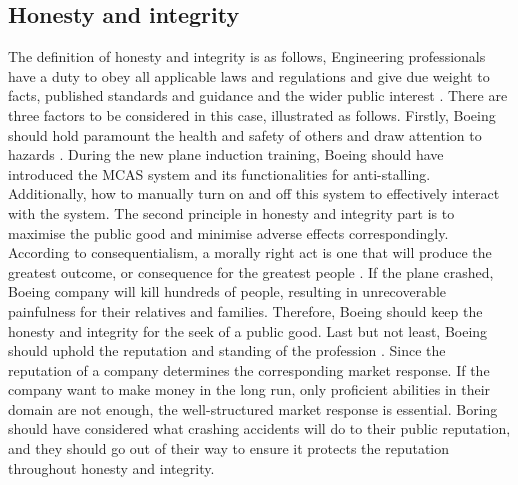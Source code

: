 \documentclass{article}
\begin{document}
\subsection{Honesty and integrity}
The definition of honesty and integrity is as follows, 
Engineering professionals have a duty to obey all applicable laws
and regulations and give due weight to facts, published standards
and guidance and the wider public interest \cite{statemen88:online}. 
There are three factors to be considered in this case, illustrated as follows.
Firstly, Boeing should hold paramount the health and safety of others and draw
attention to hazards \cite{statemen88:online}. During the new plane induction training, Boeing should have introduced the MCAS system and its functionalities for anti-stalling. Additionally, how to manually turn on and off this system to effectively interact with the system. The second principle in honesty and integrity part is to maximise the public good and minimise adverse effects correspondingly. According to consequentialism, a morally right act is one that will produce the greatest outcome, or consequence for the greatest people \cite{Conseque99:online}. If the plane crashed, Boeing company will kill hundreds of people, resulting in unrecoverable painfulness for their relatives and families. Therefore, Boeing should keep the honesty and integrity for the seek of a public good. Last but not least, Boeing should uphold the reputation and standing of the profession \cite{IEEEIEEE41:online}. Since the reputation of a company determines the corresponding market response. If the company want to make money in the long run, only proficient abilities in their domain are not enough, the well-structured market response is essential. Boring should have considered what crashing accidents will do to their public reputation, and they should go out of their way to ensure it protects the reputation throughout honesty and integrity.
\end{document}
